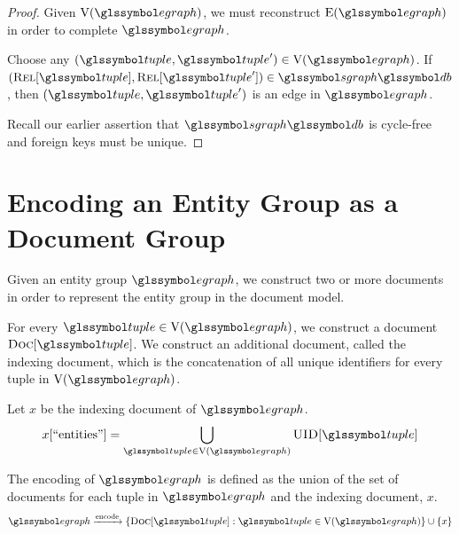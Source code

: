 		\begin{proof}
			Given \(\text{V}(\egraph)\), we must reconstruct \(\text{E}(\egraph)\) in order to complete \(\egraph\).
			
			Choose any \((\tuple, \tuple') \in \text{V}(\egraph)\).	If \((\relations{\tuple}, \relations{\tuple'}) \in \sgraph{\db}\), then \((\tuple, \tuple')\) is an edge in \(\egraph\).
			
			Recall our earlier assertion that \(\sgraph{\db}\) is cycle-free and foreign keys must be unique.
		\end{proof}
		
	\section{Encoding an Entity Group as a Document Group}
	\label{sec:encoding-entity-group-as-document-group}
		Given an entity group \(\egraph\), we construct two or more documents in order to represent the entity group in the document model.
		
		For every \(\tuple \in \text{V}(\egraph)\), we construct a document \(\docs{\tuple}\).  We construct an additional document, called the indexing document, which is the concatenation of all unique identifiers for every tuple in \(\text{V}(\egraph)\).
		
		Let \(x\) be the indexing document of \(\egraph\).
		\begin{align}
			x[\text{``entities''}] = \bigcup_{\tuple \in \text{V}\left(\egraph\right)} \uid{\tuple}
		\end{align}
		
		The encoding of \(\egraph\) is defined as the union of the set of documents for each tuple in \(\egraph\) and the indexing document, \(x\).
		\begin{align}
			\egraph \xrightarrow{\text{encode}} \{\docs{\tuple} : \tuple \in \text{V}(\egraph)\} \cup \{x\}
		\end{align}
		
